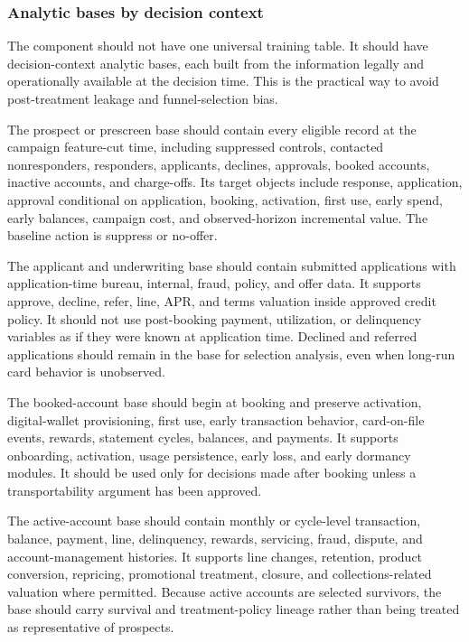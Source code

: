 \documentclass[11pt]{article}
\newcommand{\1}{\mathbf{1}}
\begin{document}
\subsubsection{Analytic bases by decision context}
\label{subsec:analytic-bases}

The component should not have one universal training table. It should have
decision-context analytic bases, each built from the information legally and
operationally available at the decision time. This is the practical way to
avoid post-treatment leakage and funnel-selection bias.

The prospect or prescreen base should contain every eligible record at the
campaign feature-cut time, including suppressed controls, contacted
nonresponders, responders, applicants, declines, approvals, booked accounts,
inactive accounts, and charge-offs. Its target objects include response,
application, approval conditional on application, booking, activation, first
use, early spend, early balances, campaign cost, and observed-horizon
incremental value. The baseline action is suppress or no-offer.

The applicant and underwriting base should contain submitted applications with
application-time bureau, internal, fraud, policy, and offer data. It supports
approve, decline, refer, line, APR, and terms valuation inside approved credit
policy. It should not use post-booking payment, utilization, or delinquency
variables as if they were known at application time. Declined and referred
applications should remain in the base for selection analysis, even when
long-run card behavior is unobserved.

The booked-account base should begin at booking and preserve activation,
digital-wallet provisioning, first use, early transaction behavior,
card-on-file events, rewards, statement cycles, balances, and payments. It
supports onboarding, activation, usage persistence, early loss, and early
dormancy modules. It should be used only for decisions made after booking
unless a transportability argument has been approved.

The active-account base should contain monthly or cycle-level transaction,
balance, payment, line, delinquency, rewards, servicing, fraud, dispute, and
account-management histories. It supports line changes, retention, product
conversion, repricing, promotional treatment, closure, and collections-related
valuation where permitted. Because active accounts are selected survivors, the
base should carry survival and treatment-policy lineage rather than being
treated as representative of prospects.
\end{document}

